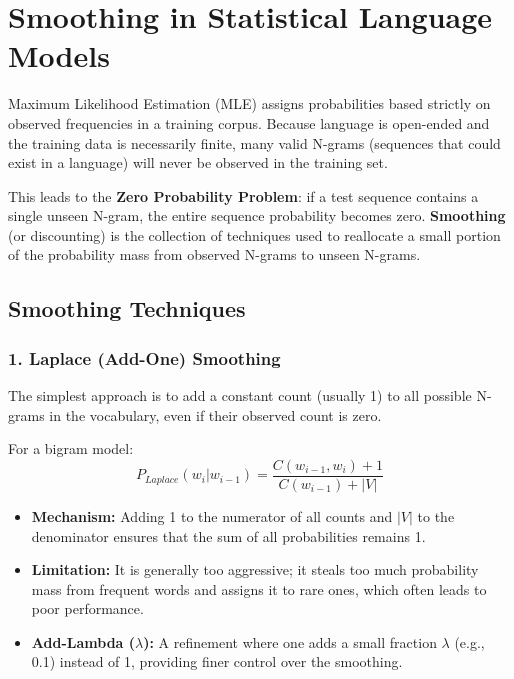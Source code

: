 \documentclass[
  italian,
  11pt,
]{article}
\providecommand{\tightlist}{%
  \setlength{\itemsep}{0pt}\setlength{\parskip}{0pt}}
\begin{document}
\newpage

\section{Smoothing in Statistical Language
Models}\label{smoothing-in-statistical-language-models}

Maximum Likelihood Estimation (MLE) assigns probabilities based strictly
on observed frequencies in a training corpus. Because language is
open-ended and the training data is necessarily finite, many valid
N-grams (sequences that could exist in a language) will never be
observed in the training set.

This leads to the \textbf{Zero Probability Problem}: if a test sequence
contains a single unseen N-gram, the entire sequence probability becomes
zero. \textbf{Smoothing} (or discounting) is the collection of
techniques used to reallocate a small portion of the probability mass
from observed N-grams to unseen N-grams.

\subsection{Smoothing Techniques}\label{smoothing-techniques}

\subsubsection{1. Laplace (Add-One)
Smoothing}\label{laplace-add-one-smoothing}

The simplest approach is to add a constant count (usually 1) to all
possible N-grams in the vocabulary, even if their observed count is
zero.

For a bigram model:
\[P_{Laplace}(w_i | w_{i-1}) = \frac{C(w_{i-1}, w_i) + 1}{C(w_{i-1}) + |V|}\]

\begin{itemize}
\tightlist
\item
  \textbf{Mechanism:} Adding 1 to the numerator of all counts and
  \(|V|\) to the denominator ensures that the sum of all probabilities
  remains 1.
\item
  \textbf{Limitation:} It is generally too aggressive; it steals too
  much probability mass from frequent words and assigns it to rare ones,
  which often leads to poor performance.
\item
  \textbf{Add-Lambda (\(\lambda\)):} A refinement where one adds a small
  fraction \(\lambda\) (e.g., 0.1) instead of 1, providing finer control
  over the smoothing.
\end{itemize}
\end{document}
